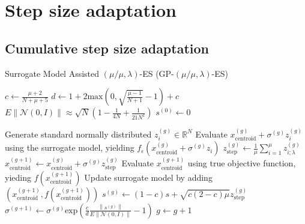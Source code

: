 








\section{Step size adaptation}\label{sec:step_size_adaptation}

\subsection{Cumulative step size adaptation}

\begin{algorithm}
\caption{Surrogate Model Assisted $(\mu/\mu,\lambda)$-ES (GP-$(\mu/\mu,\lambda)$-ES)}
\label{alg:GP-mml-es}
\begin{algorithmic}[1]
\STATE $c \leftarrow  \frac{\mu +2}{N+\mu+5}$ 
\STATE $d \leftarrow 1 + 2 \text{max}(0, \sqrt{\frac{\mu - 1}{N+1} } - 1 ) + c$
\STATE $E \left\lVert  \mathcal{N}(0,I) \right\rVert \approx \sqrt{N}(1 - \frac{1}{4N} + \frac{1}{21N^2})$
\STATE $s^{(0)} \leftarrow 0$

		\STATE Generate standard normally distributed $z_i^{(g)} \in \mathbb{R}^N $
		\STATE Evaluate $x_{\text{centroid}}^{(g)} + \sigma^{(g)} z_i^{(g)}$ using the surrogate model, yielding $f_{\epsilon}(x_{\text{centroid}}^{(g)} + \sigma^{(g)} z_i)$
	\ENDFOR
	\STATE $z_{\text{step}}^{(g)} \leftarrow \frac{1}{\mu}\sum_{i=1}^{\mu} z_{i;\lambda}^{(g)}$
	\STATE $x_{\text{centroid}}^{(g+1)} \leftarrow  x_{\text{centroid}}^{(g)} + \sigma^{(g)} z_{\text{step}}^{(g)}$ 
	\STATE Evaluate $x_{\text{centroid}}^{(g+1)}$ using true objective function, yieding $f(x_{\text{centroid}}^{(g+1)})$
	\STATE Update surrogate model by adding $(x_{\text{centroid}}^{(g+1)},f(x_{\text{centroid}}^{(g+1)}))$
	\STATE $s^{(g)} \leftarrow (1-c)s + \sqrt{ c(2-c) \mu} z_{\text{step}}^{(g)}$
	\STATE $\sigma^{(g+1)} \leftarrow \sigma^{(g)}  \text{exp} \left(\frac{c}{d} \frac{\left\lVert s^{(g)} \right\rVert} { E \left\lVert \mathcal{N}(0,I) \right\rVert} -1 \right )$
	\STATE $g \leftarrow g + 1$
\ENDWHILE

\end{algorithmic}
\end{algorithm}

